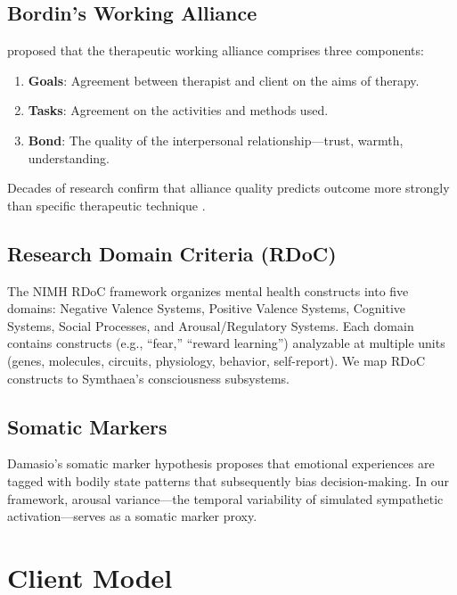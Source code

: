 \documentclass[11pt,a4paper]{article}
\begin{document}
\subsection{Bordin's Working Alliance}

\citet{bordin1979} proposed that the therapeutic working alliance comprises three components:

\begin{enumerate}[nosep]
    \item \textbf{Goals}: Agreement between therapist and client on the aims of therapy.
    \item \textbf{Tasks}: Agreement on the activities and methods used.
    \item \textbf{Bond}: The quality of the interpersonal relationship---trust, warmth, understanding.
\end{enumerate}

Decades of research confirm that alliance quality predicts outcome more strongly than specific therapeutic technique \citep{horvath2011}.

\subsection{Research Domain Criteria (RDoC)}

The NIMH RDoC framework \citep{insel2010} organizes mental health constructs into five domains: Negative Valence Systems, Positive Valence Systems, Cognitive Systems, Social Processes, and Arousal/Regulatory Systems. Each domain contains constructs (e.g., ``fear,'' ``reward learning'') analyzable at multiple units (genes, molecules, circuits, physiology, behavior, self-report). We map RDoC constructs to Symthaea's consciousness subsystems.

\subsection{Somatic Markers}

Damasio's somatic marker hypothesis \citep{damasio1994} proposes that emotional experiences are tagged with bodily state patterns that subsequently bias decision-making. In our framework, arousal variance---the temporal variability of simulated sympathetic activation---serves as a somatic marker proxy.

\section{Client Model}
\end{document}
